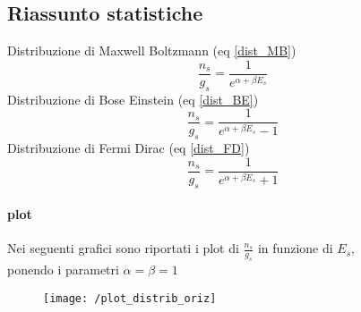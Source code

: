 \subsection{Riassunto statistiche}
Distribuzione di Maxwell Boltzmann (eq \ref{dist_MB})
\begin{equation}
\frac{ n_s}{g_s } = \frac{ 1}{e^{ \alpha + \beta E_s } }
\end{equation}
Distribuzione di Bose Einstein (eq \ref{dist_BE})
\begin{equation}
\frac{ n_s}{g_s } = \frac{ 1}{e^{ \alpha + \beta E_s } - 1 }
\end{equation}
Distribuzione di Fermi Dirac (eq \ref{dist_FD})
\begin{equation}
\frac{ n_s}{g_s } = \frac{ 1}{e^{ \alpha + \beta E_s } + 1 }
\end{equation}

\paragraph{plot}
Nei seguenti grafici sono riportati i plot di $\frac{ n_s}{g_s }$ in funzione di $E_s$, \\
ponendo i parametri $\alpha=\beta=1$
\begin{figure}[h]
\centering
\texttt{[image: /plot\_distrib\_oriz]}
\end{figure}


